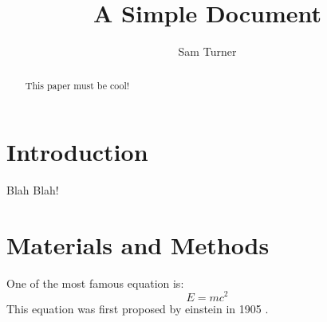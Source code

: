\documentclass[12pt]{article}
\title{A Simple Document}
\author{Sam Turner}
\date{}
\begin{document}
    \maketitle

    \begin{abstract}
        This paper must be cool!

    \end{abstract}


    \section{Introduction}
        Blah Blah!

    \section{Materials and Methods}
    One of the most famous equation is:
    \begin{equation}
     E = mc^2
    \end{equation}
    This equation was first proposed by einstein in 1905
    \cite{einstein1905does}.

    
    
\end{document}
